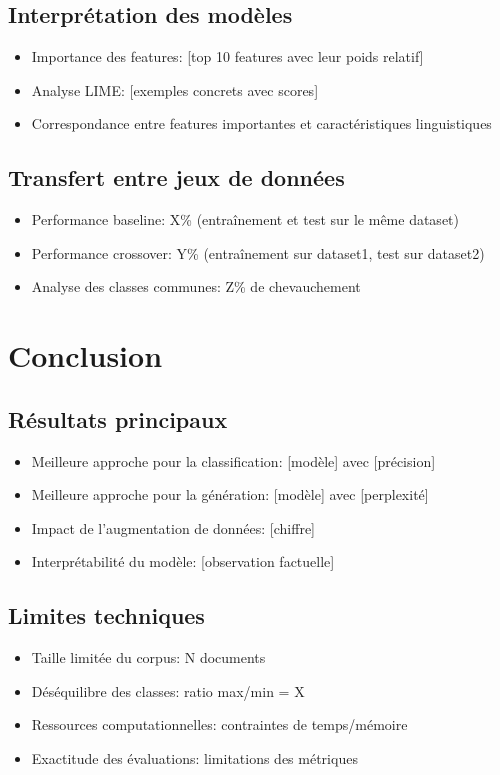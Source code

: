 \documentclass[a4paper,11pt]{article}
\begin{document}
\subsection{Interprétation des modèles}
\begin{itemize}
    \item Importance des features: [top 10 features avec leur poids relatif]
    \item Analyse LIME: [exemples concrets avec scores]
    \item Correspondance entre features importantes et caractéristiques linguistiques
\end{itemize}

\subsection{Transfert entre jeux de données}
\begin{itemize}
    \item Performance baseline: X\% (entraînement et test sur le même dataset)
    \item Performance crossover: Y\% (entraînement sur dataset1, test sur dataset2)
    \item Analyse des classes communes: Z\% de chevauchement
\end{itemize}

\section{Conclusion}
\label{sec:conclusion}

\subsection{Résultats principaux}
\begin{itemize}
    \item Meilleure approche pour la classification: [modèle] avec [précision]
    \item Meilleure approche pour la génération: [modèle] avec [perplexité]
    \item Impact de l'augmentation de données: [chiffre]
    \item Interprétabilité du modèle: [observation factuelle]
\end{itemize}

\subsection{Limites techniques}
\begin{itemize}
    \item Taille limitée du corpus: N documents
    \item Déséquilibre des classes: ratio max/min = X
    \item Ressources computationnelles: contraintes de temps/mémoire
    \item Exactitude des évaluations: limitations des métriques
\end{itemize}
\end{document}
